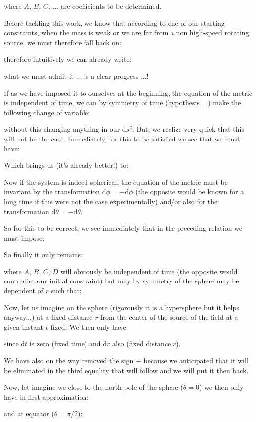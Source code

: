 	where $A$, $B$, $C$, ... are coefficients to be determined.

	Before tackling this work, we know that according to one of our starting constraints, when the mass is weak or we are far from a  non high-speed rotating source, we must therefore fall back on:
	
	therefore intuitively we can already write:
	
	what we must admit it ... is a clear progress ...!

	If as we have imposed it to ourselves at the beginning, the equation of the metric is independent of time, we can by symmetry of time (hypothesis ...) make the following change of variable:
	
	without this changing anything in our $\mathrm{d}s^2$. But, we realize very quick that this will not be the case. Immediately, for this to be satisfied we see that we must have:
	
	Which brings us (it's already better!) to:
	
	Now if the system is indeed spherical, the equation of the metric must be invariant by the transformation $\mathrm{d}\phi=-\mathrm{d}\phi$ (the opposite would be known for a long time if this were not the case experimentally) and/or also for the transformation $\mathrm{d}\theta=-\mathrm{d}\theta$.

	So for this to be correct, we see immediately that in the preceding relation we must impose:
	
	So finally it only remains:
	
	where $A$, $B$, $C$, $D$ will obviously be independent of time (the opposite would contradict our initial constraint) but may by symmetry of the sphere may be dependent of $r$ such that:
	
	Now, let us imagine on the sphere (rigorously it is a hypersphere but it helps anyway...) at a fixed distance $r$ from the center of the source of the field at a given instant $t$ fixed. We then only have:
	
	since $\mathrm{d}t$ is zero (fixed time) and $\mathrm{d}r$ also (fixed distance $r$).

	We have also on the way removed the sign $-$ because we anticipated that it will be eliminated in the third equality that will follow and we will put it then back.

	Now, let imagine we close to the north pole of the sphere ($\theta=0$) we then only have in first approximation:
	
	and at equator ($\theta=\pi/2$):
	
